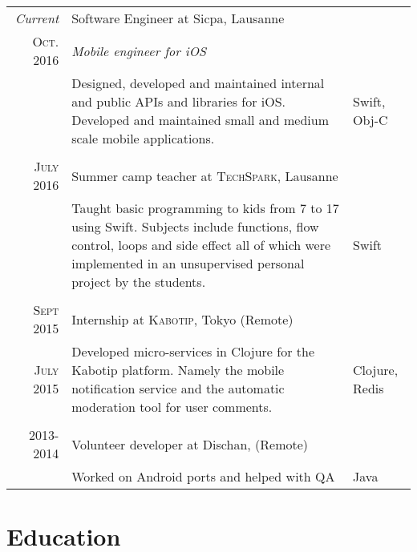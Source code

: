 \documentclass[a4paper,10pt]{article} %
\begin{document}
\begin{tabular}{r|p{9.3cm}|l}
\emph{Current} & Software Engineer at Sicpa, Lausanne\\
\textsc{Oct. 2016} & \emph{Mobile engineer for iOS}\\ 
& \footnotesize{Designed, developed and maintained internal and public APIs and libraries for iOS. Developed and maintained small and medium scale mobile applications.} & Swift, Obj-C\\
\multicolumn{2}{c}{} \\

\textsc{July 2016} & Summer camp teacher at \textsc{TechSpark}, Lausanne \emph{}\\
& \footnotesize{Taught basic programming to kids from 7 to 17 using Swift. Subjects include functions, flow control, loops and side effect all of which were implemented in an unsupervised personal project by the students.} & Swift\\
\multicolumn{2}{c}{}\\


\textsc{Sept 2015} & Internship at \textsc{Kabotip}, Tokyo (Remote) \emph{}\\
\textsc{July 2015} & \footnotesize{Developed micro-services in Clojure for the Kabotip platform. Namely the mobile notification service and the automatic moderation tool for user comments.} & Clojure, Redis\\
\multicolumn{2}{c}{}\\


\textsc{2013-2014} & Volunteer developer at Dischan, (Remote)\\
& \footnotesize{Worked on Android ports and helped with QA} & Java
\end{tabular}


\section{Education}
\end{document}
